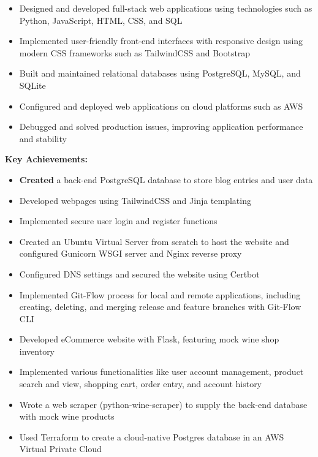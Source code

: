 \documentclass[
    10pt,
    A4,
    english,
    draft = false,
    twoside = false,
]{article}
\begin{document}
    {
    \begin{itemize}
      \item Designed and developed full-stack web applications using technologies such as Python,           JavaScript, HTML, CSS, and SQL
      \item Implemented user-friendly front-end interfaces with responsive design using modern CSS          frameworks such as TailwindCSS and Bootstrap
      \item Built and maintained relational databases using PostgreSQL, MySQL, and SQLite
      \item Configured and deployed web applications on cloud platforms such as AWS
      \item Debugged and solved production issues, improving application performance and stability
   \end{itemize}
   \begin{description}
   \color{RoyalBlue}
    \-\hspace{-.45cm}\textbf{Key Achievements:}
   \end{description}
   \begin{itemize}
      \item  \textbf{Created} a back-end PostgreSQL database to store blog entries and user data
      \item Developed webpages using TailwindCSS and Jinja templating
      \item Implemented secure user login and register functions
      \item Created an Ubuntu Virtual Server from scratch to host the website and configured Gunicorn WSGI server and Nginx reverse proxy
      \item Configured DNS settings and secured the website using Certbot
      \item Implemented Git-Flow process for local and remote applications, including creating, deleting, and merging release and feature branches with Git-Flow CLI
      \item Developed eCommerce website with Flask, featuring mock wine shop inventory
      \item Implemented various functionalities like user account management, product search and view, shopping cart, order entry, and account history
      \item  Wrote a web scraper (python-wine-scraper) to supply the back-end database with mock wine products
      \item Used Terraform to create a cloud-native Postgres database in an AWS Virtual Private Cloud
    \end{itemize}
    }
    
\end{document}
